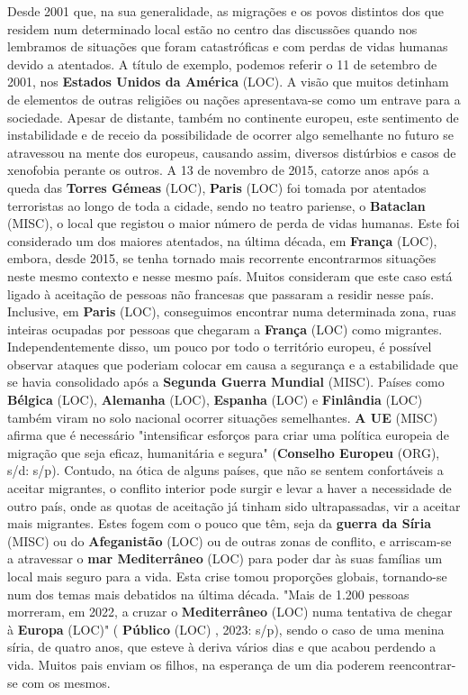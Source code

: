 \documentclass[12pt,a4paper]{article}
\begin{document}
Desde 2001 que, na sua generalidade, as migrações e os povos distintos dos que residem num determinado local estão no centro das discussões quando nos lembramos de situações que foram catastróficas e com perdas de vidas humanas devido a atentados. A título  de  exemplo,  podemos  referir  o  11  de  setembro  de  2001,  nos  \textbf{Estados  Unidos  da América} (LOC).  A  visão  que  muitos  detinham  de  elementos  de  outras  religiões  ou  nações apresentava-se  como  um  entrave  para  a  sociedade.  Apesar  de  distante,  também  no continente  europeu,  este  sentimento  de  instabilidade  e  de  receio  da  possibilidade  de ocorrer algo semelhante no futuro se atravessou na mente dos europeus, causando assim, diversos distúrbios e casos de xenofobia perante os outros. A 13 de novembro de 2015, catorze anos após a queda das \textbf{Torres Gémeas} (LOC), \textbf{Paris} (LOC) foi tomada por atentados terroristas ao longo de toda a cidade, sendo no teatro pariense, o \textbf{Bataclan} (MISC), o local que registou o maior número de perda de vidas humanas. Este foi considerado um dos maiores atentados, na  última  década,  em  \textbf{França} (LOC),  embora,  desde  2015,  se  tenha  tornado  mais  recorrente encontrarmos situações neste mesmo contexto e nesse mesmo país. Muitos consideram que este caso está ligado à aceitação de pessoas não francesas que passaram a residir nesse país. Inclusive, em \textbf{Paris} (LOC), conseguimos encontrar numa determinada zona, ruas inteiras ocupadas por pessoas que chegaram a \textbf{França} (LOC) como migrantes. Independentemente disso, um pouco por todo o território europeu, é possível observar ataques que poderiam colocar em causa a segurança e a estabilidade que se havia consolidado após a \textbf{Segunda Guerra Mundial} (MISC). Países como \textbf{Bélgica} (LOC), \textbf{Alemanha} (LOC), \textbf{Espanha} (LOC) e \textbf{Finlândia} (LOC)  também viram no solo nacional  ocorrer  situações  semelhantes.  \textbf{A  UE} (MISC)  afirma  que  é  necessário  "intensificar esforços  para  criar  uma política  europeia  de  migração  que  seja  eficaz,  humanitária  e segura"  (\textbf{Conselho  Europeu} (ORG),  s/d:  s/p).  Contudo,  na  ótica  de  alguns  países,  que  não  se sentem confortáveis a aceitar migrantes, o conflito interior pode surgir e levar a haver a necessidade de outro país, onde as quotas de aceitação já tinham sido ultrapassadas, vir a aceitar mais migrantes. Estes fogem com o pouco que têm, seja da \textbf{guerra da Síria} (MISC) ou do \textbf{Afeganistão} (LOC) ou de outras zonas de conflito, e arriscam-se a atravessar o \textbf{mar Mediterrâneo} (LOC) para  poder  dar  às  suas  famílias  um  local  mais  seguro  para  a  vida.  Esta  crise  tomou proporções globais, tornando-se num dos temas mais debatidos na última década. "Mais de 1.200 pessoas morreram, em 2022, a cruzar o \textbf{Mediterrâneo} (LOC) numa tentativa de chegar à \textbf{Europa} (LOC)" ( \textbf{Público} (LOC) , 2023: s/p), sendo o caso de uma menina síria, de quatro anos, que esteve à deriva vários dias e que acabou perdendo a vida. Muitos pais enviam os filhos, na esperança de um dia poderem reencontrar-se com os mesmos.
\end{document}
